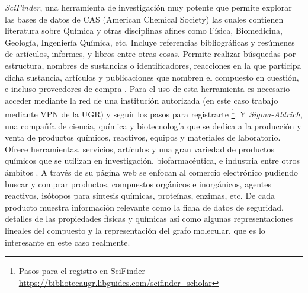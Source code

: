 \emph{SciFinder}, una herramienta de investigación muy potente que permite explorar las bases de datos de CAS (American Chemical Society) las cuales contienen literatura sobre Química y otras disciplinas afines como Física, Biomedicina, Geología, Ingeniería Química, etc. Incluye referencias bibliográficas y resúmenes de artículos, informes, y libros entre otras cosas. Permite realizar búsquedas por estructura, nombres de sustancias o identificadores, reacciones en la que participa dicha sustancia, artículos y publicaciones que nombren el compuesto en cuestión, e incluso proveedores de compra \cite{scifinder_website}. Para el uso de esta herramienta es necesario acceder mediante la red de una institución autorizada (en este caso trabajo mediante VPN de la UGR) y seguir los pasos para registrarte \footnote{Pasos para el registro en SciFinder \url{https://bibliotecaugr.libguides.com/scifinder_scholar}}. Y \emph{Sigma-Aldrich}, una compañía de ciencia, química y biotecnología que se dedica a la producción y venta de productos químicos, reactivos, equipos y materiales de laboratorio. Ofrece herramientas, servicios, artículos y una gran variedad de productos químicos que se utilizan en investigación, biofarmacéutica, e industria entre otros ámbitos \cite{sigma_aldrich_web}. A través de su página web se enfocan al comercio electrónico pudiendo buscar y comprar productos, compuestos orgánicos e inorgánicos, agentes reactivos, isótopos para síntesis químicas, proteínas, enzimas, etc. De cada producto muestra información relevante como la ficha de datos de seguridad, detalles de las propiedades físicas y químicas así como algunas representaciones lineales del compuesto y la representación del grafo molecular, que es lo interesante en este caso realmente.





